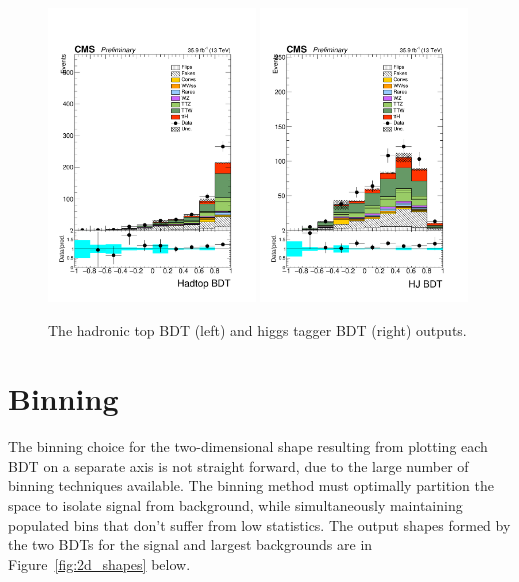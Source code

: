 \begin{figure}[htp]
\centering
\includegraphics[width=0.49\textwidth]{ch9_figs/hadtop_bdt_ttH_stackPlot_SR.pdf}
\includegraphics[width=0.49\textwidth]{ch9_figs/hj_bdt_ttH_stackPlot_SR.pdf}
\caption[Data to MC comparison of reconstruction BDT outputs]{The hadronic top BDT (left) and higgs tagger BDT (right) outputs.}
\label{fig:reco_bdt_stacks}
\end{figure}



\section{Binning}
The binning choice for the two-dimensional shape resulting from plotting each BDT on a separate axis is not straight forward, due to the large number of binning techniques
available. The binning method must optimally partition the space to isolate
signal from background, while simultaneously maintaining populated bins that don't suffer from low statistics. The output shapes formed by the two BDTs for the signal and largest backgrounds
are in Figure~\ref{fig:2d_shapes} below. 

